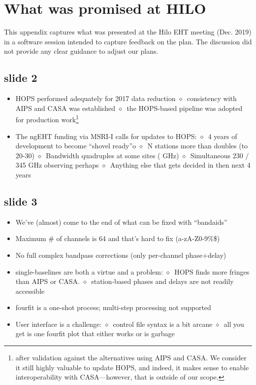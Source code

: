 %
%
\section{What was promised at HILO}
\label{sec:hilo}

This appendix captures what was presented at the Hilo
\ac{EHT} meeting (Dec. 2019) in a software session intended to
capture feedback on the plan.  The discussion
did not provide any clear guidance to adjust our plans.

\newcommand{\sbitem}{\hfill\break\hspace{2mm}$\diamond$\ }

\subsection{slide 2}
\begin{itemize}
\item \ac{HOPS} performed adequately for 2017 data reduction
\sbitem consistency with \ac{AIPS} and \ac{CASA} was established
\sbitem the \ac{HOPS}-based pipeline was adopted for production
work\footnote{%
after validation against the alternatives using \ac{AIPS} and \ac{CASA}.
We consider it still highly valuable to update \ac{HOPS}, and indeed, it
makes sense to enable interoperability with \ac{CASA}---however, that is
outside of our scope.}
\item The \ac{ngEHT} funding via \ac{MSRI}-I calls for updates to HOPS:
\sbitem 4 years of development to become “shovel ready”o
\sbitem N stations more than doubles (\eg to 20-30)
\sbitem Bandwidth quadruples at some sites ( GHz)
\sbitem Simultaneous 230 / 345 \ac{GHz} observing perhaps
\sbitem Anything else that gets decided in then next 4 years
\end{itemize}

\subsection{slide 3}
\begin{itemize}
\item We’ve (almost) come to the end of what can be fixed with “bandaids”
\item Maximum \# of channels is 64 and that’s hard to fix (a-zA-Z0-9\%\$)
\item No full complex bandpass corrections (only per-channel phase+delay)
\item single-baselines are both a virtue and a problem:
\sbitem \ac{HOPS} finds more fringes than \ac{AIPS} or \ac{CASA}.
\sbitem station-based phases and delays are not readily accessible
\item \ac{fourfit} is a one-shot process; multi-step processing not supported
\item User interface is a challenge:
\sbitem control file syntax is a bit arcane
\sbitem all you get is one \ac{fourfit} plot that either works or is garbage
\end{itemize}


